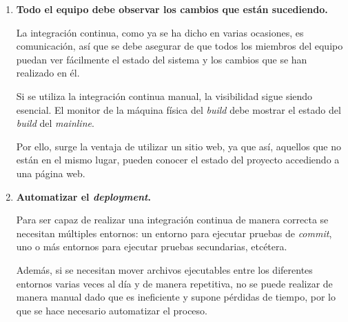 \begin{enumerate}

\item \textbf{Todo el equipo debe observar los cambios que están sucediendo.}

La integración continua, como ya se ha dicho en varias ocasiones, es comunicación, así que se debe asegurar de que todos los miembros del equipo puedan ver fácilmente el estado del sistema y los cambios que se han realizado en él\cite{dybaa2008empirical}.


Si se utiliza la integración continua manual, la visibilidad sigue siendo esencial. El monitor de la máquina física del \textit{build} debe mostrar el estado del \textit{build} del \textit{mainline}.

Por ello, surge la ventaja de utilizar un sitio web, ya que así, aquellos que no están en el mismo lugar, pueden conocer el estado del proyecto accediendo a una página web.



\item \textbf{Automatizar el \textit{deployment}.}

Para ser capaz de realizar una integración continua de manera correcta se necesitan múltiples entornos: un entorno para ejecutar pruebas de \textit{commit}, uno o más entornos para ejecutar pruebas secundarias, etcétera.

Además, si se necesitan mover archivos ejecutables entre los diferentes entornos varias veces al día y de manera repetitiva, no se puede realizar de manera manual dado que es ineficiente y supone pérdidas de tiempo, por lo que se hace necesario automatizar el proceso.


\end{enumerate}
